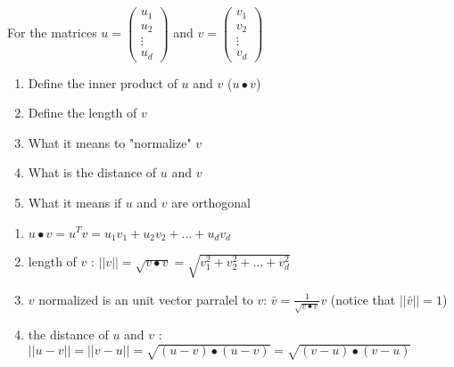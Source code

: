 \documentclass[12pt]{article}
\newcommand*{\xfield}[1]{\begin{mdframed}\centering #1\end{mdframed}\bigskip}
\newenvironment{note}{}{}
\begin{document}
\begin{note}
	\xfield{
	For the matrices $u=\begin{pmatrix}
	u_1\\
	u_2\\
	\vdots\\
	u_d
	\end{pmatrix}$ and $v=\begin{pmatrix}
	v_1\\
	v_2\\
	\vdots\\
	v_d
	\end{pmatrix}$
	\begin{enumerate}
	\item Define the inner product of $u$ and $v$ ($u 	\bullet v$)
	\item Define the length of $v$
	\item What it means to "normalize" $v$
	\item What is the distance of $u$ and $v$
	\item What it means if $u$ and $v$ are orthogonal
	\end{enumerate} }
	\xfield{\begin{enumerate}
	\item $u \bullet v = u^T v=u_1 v_1+u_2 v_2+...+u_d v_d $
	\item length of $v$ : $||v|| = \sqrt{v\bullet v} = \sqrt{v_1^2+v_2^2+...+v_d^2}$
	\item $v$ normalized is an unit vector parralel to $v$: $\bar{v} = \frac{1}{\sqrt{v\bullet v}}v$ (notice that $||\bar{v}|| = 1$)
		\item the distance of $u$ and $v$ : $||u-v|| = ||v-u|| = \sqrt{(u-v) \bullet (u-v)} = \sqrt{(v-u)\bullet (v-u)}$
	\end{enumerate} }
\end{note}

%	
\end{document}
